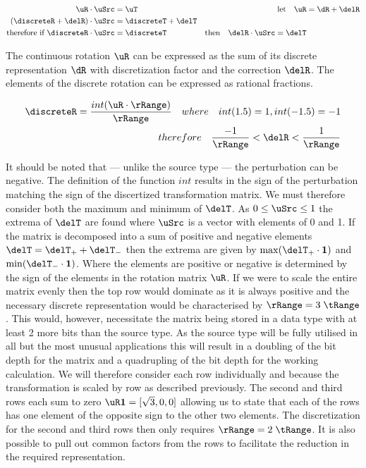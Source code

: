 \begin{equation}\label{eq:lxyPixel}
\begin{aligned}
\uR  \cdot \uSrc &= \uT  &\text{let} \quad \uR &= \dR + \delR \\
(\discreteR + \delR)  \cdot \uSrc &= \discreteT + \delT \\
\text{therefore if } \discreteR \cdot \uSrc &= \discreteT & \text{then}\quad \delR  \cdot \uSrc = \delT
\end{aligned} 
\end{equation}

The continuous rotation $\uR$ can be expressed as the sum of its discrete representation $\dR$ with discretization factor and the correction $\delR$. The elements of the discrete rotation can be expressed as rational fractions.

\begin{eqnarray}\label{eq:dRRange}
\discreteR = \dfrac{int(\uR \cdot \rRange)}{\rRange}\quad where\quad int(1.5) = 1, int (-1.5) = -1\\
therefore\quad \dfrac{-1}{\rRange} < \delR  < \dfrac{1}{\rRange}
\end{eqnarray}

It should be noted that --- unlike the source type \uSrc --- the perturbation can be negative. The definition of the function $int$ results in the sign of the perturbation matching the sign of the discertized transformation matrix. We must therefore consider both the maximum and minimum of $\delT$. As $0 \le\uSrc \le 1$ the extrema of $\delT$ are found where $\uSrc$ is a vector with elements of 0 and 1. If the matrix is decomposed into a sum of positive and negative elements $\delT = \delT_+ + \delT_-$ then the extrema are given by $\max(\delT_+ \cdot \mathbf{1})$ and $\min(\delT_- \cdot \mathbf{1})$. Where the elements are positive or negative is determined by the sign of the elements in the rotation matrix $\uR$. If we were to scale the entire matrix evenly then the top row would dominate as it is always positive and the necessary discrete representation would be characterised by $\rRange = 3 \; \tRange$. This would, however, necessitate the matrix being stored in a data type with at least 2 more bits than the source type. As the source type will be fully utilised in all but the most unusual applications this will result in a doubling of the bit depth for the matrix and a quadrupling of the bit depth for the working calculation. We will therefore consider each row individually and because the transformation is scaled by row as described previously. The second and third rows each sum to zero $\uR \mathbf{1} = [\sqrt{3},0,0]$ allowing us to state that each of the rows has one element of the opposite sign to the other two elements. The discretization for the second and third rows then only requires $\rRange = 2 \; \tRange$. It is also possible to pull out common factors from the rows to facilitate the reduction in the required representation.

